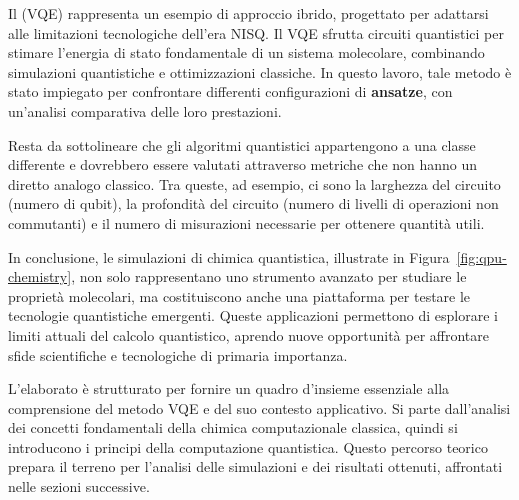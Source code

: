 Il  (VQE) \cite{Peruzzo_2014} rappresenta un esempio di approccio ibrido, progettato per adattarsi alle limitazioni tecnologiche dell’era NISQ. Il VQE sfrutta circuiti quantistici per stimare l’energia di stato fondamentale di un sistema molecolare, combinando simulazioni quantistiche e ottimizzazioni classiche. In questo lavoro, tale metodo è stato impiegato per confrontare differenti configurazioni di \textbf{ansatze}, con un’analisi comparativa delle loro prestazioni.

Resta da sottolineare che gli algoritmi quantistici appartengono a una classe differente e dovrebbero essere valutati attraverso metriche che non hanno un diretto analogo classico. Tra queste, ad esempio, ci sono la larghezza del circuito (numero di qubit), la profondità del circuito (numero di livelli di operazioni non commutanti) e il numero di misurazioni necessarie per ottenere quantità utili. 

In conclusione, le simulazioni di chimica quantistica, illustrate in Figura~\ref{fig:qpu-chemistry}, non solo rappresentano uno strumento avanzato per studiare le proprietà molecolari, ma costituiscono anche una piattaforma per testare le tecnologie quantistiche emergenti. Queste applicazioni permettono di esplorare i limiti attuali del calcolo quantistico, aprendo nuove opportunità per affrontare sfide scientifiche e tecnologiche di primaria importanza.

L’elaborato è strutturato per fornire un quadro d'insieme essenziale alla comprensione del metodo VQE e del suo contesto applicativo. Si parte dall’analisi dei concetti fondamentali della chimica computazionale classica, quindi si introducono i principi della computazione quantistica. Questo percorso teorico prepara il terreno per l’analisi delle simulazioni e dei risultati ottenuti, affrontati nelle sezioni successive.